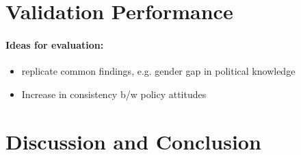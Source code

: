 \documentclass[12pt]{article}
\begin{document}
\section{Validation Performance}


\paragraph{Ideas for evaluation:}
\begin{itemize}\singlespacing
\item replicate common findings, e.g. gender gap in political knowledge \citep[e.g.][]{barabas2014question}
\item Increase in consistency b/w policy attitudes \citep[e.g.][]{prior2014visual}
\end{itemize}

\section{Discussion and Conclusion}


\clearpage\singlespacing\footnotesize


\end{document}
